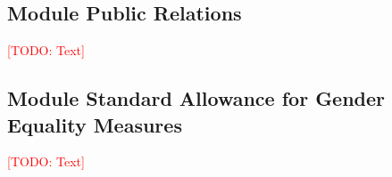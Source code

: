 \documentclass[american,firsttime]{dfgproposal}
\newcommand{\todo}[1]{\xspace{\textcolor{red}{[TODO: #1]}}\xspace}
\begin{document}
	\subsection{Module Public Relations}
	\todo{Text}
	
	\subsection{Module Standard Allowance for Gender Equality Measures}
	\todo{Text}
\end{document}
